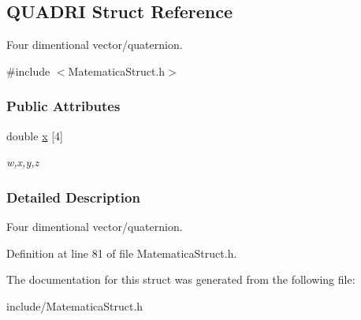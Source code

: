 \hypertarget{structQUADRI}{\subsection{\-Q\-U\-A\-D\-R\-I \-Struct \-Reference}
\label{structQUADRI}
}


\-Four dimentional vector/quaternion.  




{\ttfamily \#include $<$\-Matematica\-Struct.\-h$>$}

\subsubsection*{\-Public \-Attributes}
\begin{DoxyCompactItemize}
\item 
\hypertarget{structQUADRI_ad1f678f640ba00a561dbd8dc314a8c5d}{double \hyperlink{structQUADRI_ad1f678f640ba00a561dbd8dc314a8c5d}{x} \mbox{[}4\mbox{]}}\label{structQUADRI_ad1f678f640ba00a561dbd8dc314a8c5d}

\begin{DoxyCompactList}\small\item\em w,x,y,z \end{DoxyCompactList}\end{DoxyCompactItemize}


\subsubsection{\-Detailed \-Description}
\-Four dimentional vector/quaternion. 

\-Definition at line 81 of file \-Matematica\-Struct.\-h.



\-The documentation for this struct was generated from the following file\-:\begin{DoxyCompactItemize}
\item 
include/\-Matematica\-Struct.\-h\end{DoxyCompactItemize}
